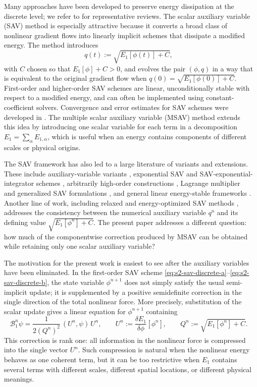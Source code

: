 \documentclass[10pt,onefignum,onetabnum,hidelinks]{siamart251216}
\begin{document}
Many approaches have been developed to preserve energy dissipation at the discrete level; we refer to \cite{MR4378430,shen2019new} for representative reviews.  The scalar auxiliary variable (SAV) method \cite{shen2018scalar,shen2019new} is especially attractive because it converts a broad class of nonlinear gradient flows into linearly implicit schemes that dissipate a modified energy.  The method introduces
\[
    q(t):=\sqrt{E_1[\phi(t)]+C},
\]
with $C$ chosen so that $E_1[\phi]+C>0$, and evolves the pair $(\phi,q)$ in a way that is equivalent to the original gradient flow when $q(0)=\sqrt{E_1[\phi(0)]+C}$.  First-order and higher-order SAV schemes are linear, unconditionally stable with respect to a modified energy, and can often be implemented using constant-coefficient solvers.  Convergence and error estimates for SAV schemes were developed in \cite{shen2018convergence}.  The multiple scalar auxiliary variable (MSAV) method \cite{cheng2018multiple} extends this idea by introducing one scalar variable for each term in a decomposition $E_1=\sum_\alpha E_{1,\alpha}$, which is useful when an energy contains components of different scales or physical origins.

The SAV framework has also led to a large literature of variants and extensions.  These include auxiliary-variable variants \cite{hou2019variant,huang2020highly}, exponential SAV and SAV-exponential-integrator schemes \cite{liu2020exponential,ju2022generalized}, arbitrarily high-order constructions \cite{gong2019arbitrarily}, Lagrange multiplier and generalized SAV formulations \cite{cheng2020new,cheng2021generalized}, and general linear energy-stable frameworks \cite{tan2022general}.  Another line of work, including relaxed and energy-optimized SAV methods \cite{jiang2022improving,zhang2022generalized,huang2024computationally,liu2024novel,zhang2025relaxed}, addresses the consistency between the numerical auxiliary variable $q^n$ and its defining value $\sqrt{E_1[\phi^n]+C}$.  The present paper addresses a different question: how much of the componentwise correction produced by MSAV can be obtained while retaining only one scalar auxiliary variable?

The motivation for the present work is easiest to see after the auxiliary variables have been eliminated.  In the first-order SAV scheme \eqref{eq:s2-sav-discrete-a}--\eqref{eq:s2-sav-discrete-b}, the state variable $\phi^{n+1}$ does not simply satisfy the usual semi-implicit update; it is supplemented by a positive semidefinite correction in the single direction of the total nonlinear force.  More precisely, substitution of the scalar update gives a linear equation for $\phi^{n+1}$ containing
\[
    \mathcal B_1^n\psi
    =
    \frac{1}{2(Q^n)^2}\,(U^n,\psi)\,U^n,
    \qquad
    U^n:=\frac{\delta E_1}{\delta\phi}[\phi^n],
    \qquad
    Q^n:=\sqrt{E_1[\phi^n]+C}.
\]
This correction is rank one: all information in the nonlinear force is compressed into the single vector $U^n$.  Such compression is natural when the nonlinear energy behaves as one coherent term, but it can be too restrictive when $E_1$ contains several terms with different scales, different spatial locations, or different physical meanings.
\end{document}
